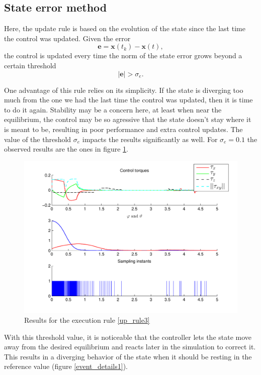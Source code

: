\documentclass{article}
\begin{document}
		\subsection{State error method}
			Here, the update rule is based on the evolution of the state since the last time the control was updated. Given the error
			\[
				\mathbf{e} = \mathbf{x}(t_k) - \mathbf{x}(t),
			\]
			the control is updated every time the norm of the state error grows beyond a certain threshold
			\begin{equation}
				|\mathbf{e}| > \sigma_e.
				\label{up_rule3}
			\end{equation}
			
			One advantage of this rule relies on its simplicity. If the state is diverging too much from the one we had the last time the control was updated, then it is time to do it again. Stability may be a concern here, at least when near the equilibrium, the control may be so agressive that the state doesn't stay where it is meant to be, resulting in poor performance and extra control updates. The value of the threshold $\sigma_e$ impacts the results significantly as well. For $\sigma_e=0.1$ the observed results are the ones in figure \ref{event_results3}.
			\begin{figure}
				\centering
				\includegraphics[width=\textwidth]{event_3}
				\caption{Results for the execution rule \eqref{up_rule3} \label{event_results3}}
			\end{figure}
			With this threshold value, it is noticeable that the controller lets the state move away from the desired equilibrium and reacts later in the simulation to correct it. This results in a diverging behavior of the state when it should be resting in the reference value (figure \ref{event_details1}).
\end{document}
